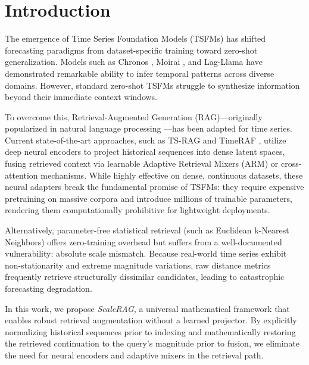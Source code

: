 \section{Introduction}
\label{sec:introduction}

The emergence of Time Series Foundation Models (TSFMs) has shifted forecasting paradigms from dataset-specific training toward zero-shot generalization. Models such as Chronos \cite{chronos}, Moirai \cite{moirai}, and Lag-Llama \cite{lagllama} have demonstrated remarkable ability to infer temporal patterns across diverse domains. However, standard zero-shot TSFMs struggle to synthesize information beyond their immediate context windows.

To overcome this, Retrieval-Augmented Generation (RAG)---originally popularized in natural language processing \cite{rag}---has been adapted for time series. Current state-of-the-art approaches, such as TS-RAG \cite{tsrag} and TimeRAF \cite{timeraf}, utilize deep neural encoders to project historical sequences into dense latent spaces, fusing retrieved context via learnable Adaptive Retrieval Mixers (ARM) or cross-attention mechanisms. While highly effective on dense, continuous datasets, these neural adapters break the fundamental promise of TSFMs: they require expensive pretraining on massive corpora and introduce millions of trainable parameters, rendering them computationally prohibitive for lightweight deployments.

Alternatively, parameter-free statistical retrieval (such as Euclidean k-Nearest Neighbors) offers zero-training overhead but suffers from a well-documented vulnerability: absolute scale mismatch. Because real-world time series exhibit non-stationarity and extreme magnitude variations, raw distance metrics frequently retrieve structurally dissimilar candidates, leading to catastrophic forecasting degradation.

In this work, we propose \textit{ScaleRAG}, a universal mathematical framework that enables robust retrieval augmentation without a learned projector. By explicitly normalizing historical sequences prior to indexing and mathematically restoring the retrieved continuation to the query's magnitude prior to fusion, we eliminate the need for neural encoders and adaptive mixers in the retrieval path.

